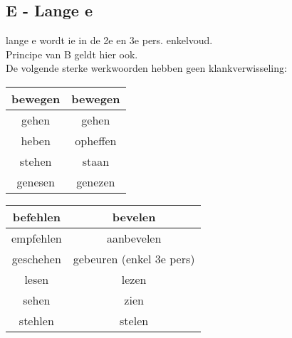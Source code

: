 \documentclass[main.tex]{subfiles}
\begin{document}
\subsection{E - Lange e}
\begin{minipage}{0.5\textwidth}
lange e wordt ie in de 2e en 3e pers. enkelvoud.\\
Principe van B geldt hier ook.\\
De volgende sterke werkwoorden hebben geen klankverwisseling:\\
\begin{tabular}{|c|c|}
\hline 
bewegen & bewegen \\ 
\hline 
gehen & gehen \\ 
\hline 
heben & opheffen \\ 
\hline 
stehen & staan \\ 
\hline 
genesen & genezen \\ 
\hline 
\end{tabular} 
\end{minipage}
\begin{minipage}{0.5\textwidth}
\begin{tabular}{|c|c|}
\hline 
befehlen & bevelen \\ 
\hline 
empfehlen & aanbevelen \\ 
\hline 
geschehen & gebeuren (enkel 3e pers) \\ 
\hline 
lesen & lezen \\ 
\hline 
sehen & zien \\ 
\hline 
stehlen & stelen \\ 
\hline 
\end{tabular} 
\end{minipage}
\end{document}
